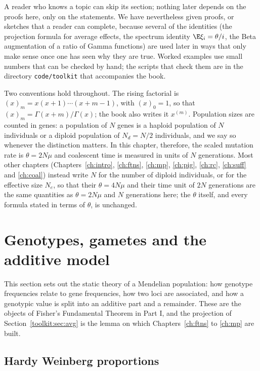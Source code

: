 A reader who knows a topic can skip its section; nothing later depends on the proofs here, only
on the statements. We have nevertheless given proofs, or sketches that a reader can complete,
because several of the identities (the projection formula for average effects, the spectrum
identity $\E\xi_i=\theta/i$, the Beta augmentation of a ratio of Gamma functions) are used later
in ways that only make sense once one has seen why they are true. Worked examples use small
numbers that can be checked by hand; the scripts that check them are in the directory
\texttt{code/toolkit} that accompanies the book.

Two conventions hold throughout. The rising factorial is
$(x)_m=x(x+1)\cdots(x+m-1)$, with $(x)_0=1$, so that $(x)_m=\Gamma(x+m)/\Gamma(x)$; the
book also writes it $x^{(m)}$. Population sizes are counted in genes: a population of $N$ genes
is a haploid population of $N$ individuals or a diploid population of $N_d=N/2$ individuals, and we
say so whenever the distinction matters. In this chapter, therefore, the scaled mutation rate is
$\theta=2N\mu$ and coalescent time is measured in units of $N$ generations. Most other
chapters (Chapters~\ref{ch:intro}, \ref{ch:ftns}, \ref{ch:mp}, \ref{ch:pig}, \ref{ch:rc},
\ref{ch:suff} and \ref{ch:coal}) instead write $N$ for the number of diploid individuals, or for the effective size
$N_e$, so that their $\theta=4N\mu$ and their time unit of $2N$ generations are the same
quantities as $\theta=2N\mu$ and $N$ generations here; the $\theta$ itself, and every formula
stated in terms of $\theta$, is unchanged.

\section{Genotypes, gametes and the additive model}\label{toolkit:sec:hw}

This section sets out the static theory of a Mendelian population: how genotype frequencies
relate to gene frequencies, how two loci are associated, and how a genotypic value is split into
an additive part and a remainder. These are the objects of Fisher's Fundamental Theorem in
Part I, and the projection of Section~\ref{toolkit:sec:avg} is the lemma on which
Chapters~\ref{ch:ftns} to \ref{ch:mp} are built.

\subsection{Hardy Weinberg proportions}\label{toolkit:sec:hwlaw}

